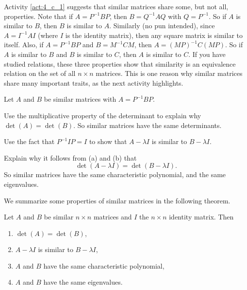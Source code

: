 Activity \ref{act:4_c_1} suggests that similar matrices share some, but not all, properties. Note that if $A = P^{-1}BP$, then $B = Q^{-1}AQ$ with $Q = P^{-1}$. So if $A$ is similar to $B$, then $B$ is similar to $A$. Similarly (no pun intended), since $A = I^{-1}AI$ (where $I$ is the identity matrix), then any square matrix is similar to itself. Also, if $A = P^{-1}BP$ and $B = M^{-1}CM$, then $A = (MP)^{-1}C(MP)$. So if $A$ is similar to $B$ and $B$ is similar to $C$, then $A$ is similar to $C$. If you have studied relations, these three properties show that similarity is an equivalence relation on the set of all $n \times n$ matrices. This is one reason why similar matrices share many important traits, as the next activity highlights.



\begin{activity} \label{act:4_c_2} Let $A$ and $B$ be similar matrices with $A = P^{-1}BP$.
\ba
\item Use the multiplicative property of the determinant to explain why $\det(A) = \det(B)$. So similar matrices have the same determinants.




\item Use the fact that $P^{-1}IP = I$ to show that $A-\lambda I$ is similar to $B - \lambda I$.




\item Explain why it follows from (a) and (b) that 
\[\det(A - \lambda I) = \det(B - \lambda I).\]
So similar matrices have the same characteristic polynomial, and the same eigenvalues.



\ea

\end{activity}



We summarize some properties of similar matrices in the following theorem.



\begin{theorem} Let $A$ and $B$ be similar $n \times n$ matrices and $I$ the $n \times n$ identity matrix. Then
\begin{enumerate}
\item $\det(A) = \det(B)$,
\item $A-\lambda I$ is similar to $B - \lambda I$,
\item $A$ and $B$ have the same characteristic polynomial,
\item $A$ and $B$ have the same eigenvalues.
\end{enumerate}
\end{theorem}

